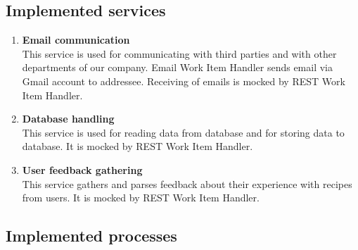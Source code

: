 \documentclass[11pt,a4paper]{article}
\begin{document}

\subsection{Implemented services}

\begin{enumerate}
    \item \textbf{Email communication}\\
    This service is used for communicating with third parties and with other departments of our company. Email Work Item Handler sends email via Gmail account to addressee. Receiving of emails is mocked by REST Work Item Handler.
    \item \textbf{Database handling}\\
    This service is used for reading data from database and for storing data to database. It is mocked by REST Work Item Handler.
    \item \textbf{User feedback gathering}\\
    This service gathers and parses feedback about their experience with recipes from users. It is mocked by REST Work Item Handler.
    
\end{enumerate}


\subsection{Implemented processes}
\end{document}

